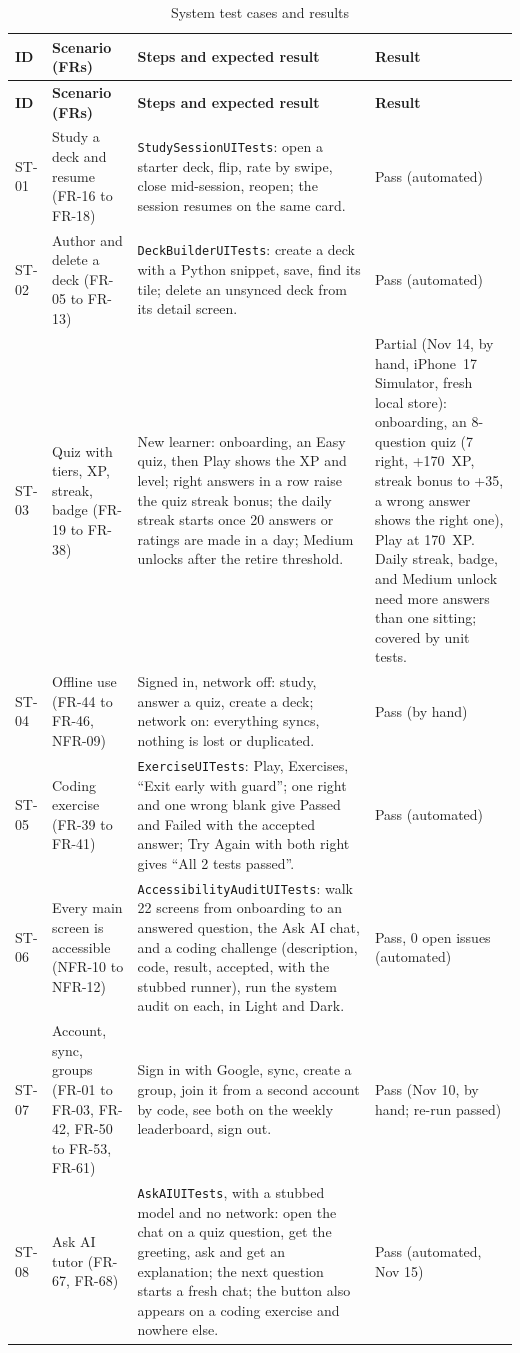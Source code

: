 \documentclass[12pt,letterpaper]{article}
\begin{document}
\begin{xltabular}{\textwidth}{@{}L{1.0cm} L{3.0cm} Y L{2.4cm}@{}}
\caption{System test cases and results}\label{tab:systests}\\
\toprule
\textbf{ID} & \textbf{Scenario (FRs)} & \textbf{Steps and expected result} & \textbf{Result} \\
\midrule
\endfirsthead
\toprule
\textbf{ID} & \textbf{Scenario (FRs)} & \textbf{Steps and expected result} & \textbf{Result} \\
\midrule
\endhead
\bottomrule
\endfoot
ST-01 & Study a deck and resume (FR-16 to FR-18) & \texttt{StudySessionUITests}: open a starter deck, flip, rate by swipe, close mid-session, reopen; the session resumes on the same card. & Pass (automated) \\
ST-02 & Author and delete a deck (FR-05 to FR-13) & \texttt{DeckBuilderUITests}: create a deck with a Python snippet, save, find its tile; delete an unsynced deck from its detail screen. & Pass (automated) \\
ST-03 & Quiz with tiers, XP, streak, badge (FR-19 to FR-38) & New learner: onboarding, an Easy quiz, then Play shows the XP and level; right answers in a row raise the quiz streak bonus; the daily streak starts once 20 answers or ratings are made in a day; Medium unlocks after the retire threshold. & Partial (Nov 14, by hand, iPhone~17 Simulator, fresh local store): onboarding, an 8-question quiz (7 right, +170~XP, streak bonus to +35, a wrong answer shows the right one), Play at 170~XP. Daily streak, badge, and Medium unlock need more answers than one sitting; covered by unit tests. \\
ST-04 & Offline use (FR-44 to FR-46, NFR-09) & Signed in, network off: study, answer a quiz, create a deck; network on: everything syncs, nothing is lost or duplicated. & Pass (by hand) \\
ST-05 & Coding exercise (FR-39 to FR-41) & \texttt{ExerciseUITests}: Play, Exercises, ``Exit early with guard''; one right and one wrong blank give Passed and Failed with the accepted answer; Try Again with both right gives ``All 2 tests passed''. & Pass (automated) \\
ST-06 & Every main screen is accessible (NFR-10 to NFR-12) & \texttt{AccessibilityAuditUITests}: walk 22 screens from onboarding to an answered question, the Ask AI chat, and a coding challenge (description, code, result, accepted, with the stubbed runner), run the system audit on each, in Light and Dark. & Pass, 0 open issues (automated) \\
ST-07 & Account, sync, groups (FR-01 to FR-03, FR-42, FR-50 to FR-53, FR-61) & Sign in with Google, sync, create a group, join it from a second account by code, see both on the weekly leaderboard, sign out. & Pass (Nov 10, by hand; re-run passed) \\
ST-08 & Ask AI tutor (FR-67, FR-68) & \texttt{AskAIUITests}, with a stubbed model and no network: open the chat on a quiz question, get the greeting, ask and get an explanation; the next question starts a fresh chat; the button also appears on a coding exercise and nowhere else. & Pass (automated, Nov 15) \\
\end{xltabular}
\end{document}
